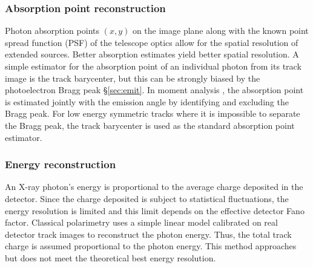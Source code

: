
\subsubsection{Absorption point reconstruction}
\label{sec:absp}
Photon absorption points $(x,y)$ on the image plane along with the known point spread function (PSF) of the telescope optics allow for the spatial resolution of extended sources. Better absorption estimates yield better spatial resolution. A simple estimator for the absorption point of an individual photon from its track image is the track barycenter, but this can be strongly biased by the photoelectron Bragg peak \S\ref{sec:emit}. In moment analysis \citep{bellazzini_novel_2003}, the absorption point is estimated jointly with the emission angle by identifying and excluding the Bragg peak.
For low energy symmetric tracks where it is impossible to separate the Bragg peak, the track barycenter is used as the standard absorption point estimator.


\subsubsection{Energy reconstruction}
\label{sec:E}
An X-ray photon's energy is proportional to the average charge deposited in the detector. Since the charge deposited is subject to statistical fluctuations, the energy resolution is limited and this limit depends on the effective detector Fano factor. Classical polarimetry uses a simple linear model calibrated on real detector track images to reconstruct the photon energy. Thus, the total track charge is assumed proportional to the photon energy. This method approaches but does not meet the theoretical best energy resolution.

